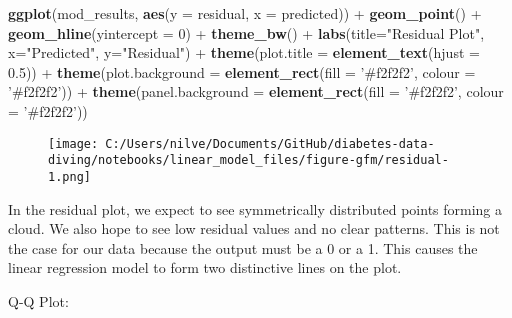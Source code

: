 \documentclass[
]{article}
\newenvironment{Shaded}{}{}
\newcommand{\DataTypeTok}[1]{\textcolor[rgb]{0.56,0.13,0.00}{#1}}
\newcommand{\DecValTok}[1]{\textcolor[rgb]{0.25,0.63,0.44}{#1}}
\newcommand{\FloatTok}[1]{\textcolor[rgb]{0.25,0.63,0.44}{#1}}
\newcommand{\KeywordTok}[1]{\textcolor[rgb]{0.00,0.44,0.13}{\textbf{#1}}}
\newcommand{\NormalTok}[1]{#1}
\newcommand{\OperatorTok}[1]{\textcolor[rgb]{0.40,0.40,0.40}{#1}}
\newcommand{\StringTok}[1]{\textcolor[rgb]{0.25,0.44,0.63}{#1}}
\begin{document}
\begin{Shaded}
\begin{Highlighting}[]
\KeywordTok{ggplot}\NormalTok{(mod_results, }\KeywordTok{aes}\NormalTok{(}\DataTypeTok{y =}\NormalTok{ residual, }\DataTypeTok{x =}\NormalTok{ predicted)) }\OperatorTok{+}\StringTok{ }
\StringTok{    }\KeywordTok{geom_point}\NormalTok{() }\OperatorTok{+}\StringTok{ }
\StringTok{    }\KeywordTok{geom_hline}\NormalTok{(}\DataTypeTok{yintercept =} \DecValTok{0}\NormalTok{) }\OperatorTok{+}
\StringTok{      }\KeywordTok{theme_bw}\NormalTok{() }\OperatorTok{+}
\StringTok{  }\KeywordTok{labs}\NormalTok{(}\DataTypeTok{title=}\StringTok{"Residual Plot"}\NormalTok{, }\DataTypeTok{x=}\StringTok{"Predicted"}\NormalTok{, }\DataTypeTok{y=}\StringTok{"Residual"}\NormalTok{) }\OperatorTok{+}
\StringTok{  }\KeywordTok{theme}\NormalTok{(}\DataTypeTok{plot.title =} \KeywordTok{element_text}\NormalTok{(}\DataTypeTok{hjust =} \FloatTok{0.5}\NormalTok{)) }\OperatorTok{+}
\StringTok{  }\KeywordTok{theme}\NormalTok{(}\DataTypeTok{plot.background =} \KeywordTok{element_rect}\NormalTok{(}\DataTypeTok{fill =} \StringTok{'#f2f2f2'}\NormalTok{, }\DataTypeTok{colour =} \StringTok{'#f2f2f2'}\NormalTok{)) }\OperatorTok{+}
\StringTok{  }\KeywordTok{theme}\NormalTok{(}\DataTypeTok{panel.background =} \KeywordTok{element_rect}\NormalTok{(}\DataTypeTok{fill =} \StringTok{'#f2f2f2'}\NormalTok{, }\DataTypeTok{colour =} \StringTok{'#f2f2f2'}\NormalTok{))}
\end{Highlighting}
\end{Shaded}

\begin{figure}
\centering
\texttt{[image: C:/Users/nilve/Documents/GitHub/diabetes-data-diving/notebooks/linear\_model\_files/figure-gfm/residual-1.png]}
\caption{}
\end{figure}

In the residual plot, we expect to see symmetrically distributed points
forming a cloud. We also hope to see low residual values and no clear
patterns. This is not the case for our data because the output must be a
0 or a 1. This causes the linear regression model to form two
distinctive lines on the plot.

Q-Q Plot:
\end{document}
